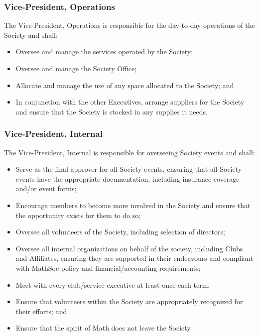 \subsubsection{Vice-President, Operations}
The Vice-President, Operations is responsible for the day-to-day operations of
the Society and shall:
\begin{itemize}
  \item Oversee and manage the services operated by the Society;
  \item Oversee and manage the Society Office;
  \item Allocate and manage the use of any space allocated to the Society; and
  \item In conjunction with the other Executives, arrange suppliers for the
    Society and ensure that the Society is stocked in any supplies it needs.
\end{itemize}

\subsubsection{Vice-President, Internal}
The Vice-President, Internal is responsible for overseeing Society events and
shall:
\begin{itemize}
  \item Serve as the final approver for all Society events, ensuring that all Society events have the appropriate documentation,
    including insurance coverage and/or event forms;
  \item Encourage members to become more involved in the Society and ensure that
    the opportunity exists for them to do so;
  \item Oversee all volunteers of the Society, including selection of directors;
    \item Oversee all internal organizations on behalf of the society, including Clubs and Affiliates, ensuring they are supported in their endeavours and compliant with MathSoc policy and financial/accounting requirements;
  \item Meet with every club/service executive at least once each term;
  \item Ensure that volunteers within the Society are appropriately recognized for their efforts; and
  \item Ensure that the spirit of Math does not leave the Society.

\end{itemize}


